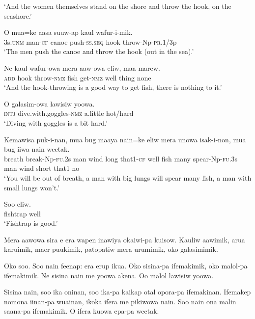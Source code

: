 \glt ‘And the women themselves stand on the shore and throw the hook, on the seashore.’ \\
\z


\ea
\gll  O  mua=ke  aasa  suuw-ap  kaul  wafur-i-mik. \\
3s.\textsc{unm}  man-\textsc{cf}  canoe  push-\textsc{ss.seq}  hook  throw-Np-\textsc{pr}.1/3p \\
\glt ‘The men push the canoe and throw the hook (out in the sea).’ \\
\z


\ea
\gll  Ne  kaul  wafur-owa  mera  aaw-owa  eliw,  maa  marew. \\
\textsc{add}  hook  throw-\textsc{nmz}  fish  get-\textsc{nmz}  well  thing  none \\
\glt ‘And the hook-throwing is a good way to get fish, there is nothing to it.’ \\
\z


\ea
\gll  O  galasim-owa  lawisiw  yoowa. \\
\textsc{intj}  dive.with.goggles-\textsc{nmz}  a.little  hot/hard \\
\glt ‘Diving with goggles is a bit hard.’ \\
\z


\ea
\gll  Kemawisa  puk-i-nan,  mua  bug  maaya  nain=ke  eliw  mera  unowa  isak-i-non,  mua  bug  iiwa  nain  weetak. \\
breath  break-Np-\textsc{fu}.2s  man  wind  long  that1-\textsc{cf}  well     fish  many  spear-Np-\textsc{fu}.3s  man  wind  short  that1  no \\


\glt ‘You will be out of breath, a man with big lungs will spear many fish, a man with small lungs won’t.’ \\
\z


\ea
\gll  Soo  eliw. \\
fishtrap  well \\
\glt ‘Fishtrap is good.’ \\
\z

Mera  aawowa  sira  e  era  wapen  inawiya okaiwi-pa  kuisow. 
Kauliw  aawimik,  arua  karuimik,  maer  puukimik,  patopatiw  mera  urumimik,  oko  galasimimik.

Oko  soo. 
Soo  nain  feenap:  era  erup  ikua. 
Oko  sisina-pa  ifemakimik,  oko  malol-pa   ifemakimik. 
Ne  sisina  nain  me  yoowa  akena. 
Oo  malol  lawisiw  yoowa. 

Sisina  nain,  soo  ika  oninan, soo  ika-pa  kaikap  otal  opora-pa ifemakinan. 
Ifemakep  nomona  iinan-pa  wuainan,  ikoka  ifera  me  pikiwowa  nain. 
Soo  nain  ona  malin  saana-pa  ifemakimik. 
O  ifera  kuowa  epa-pa  weetak.

